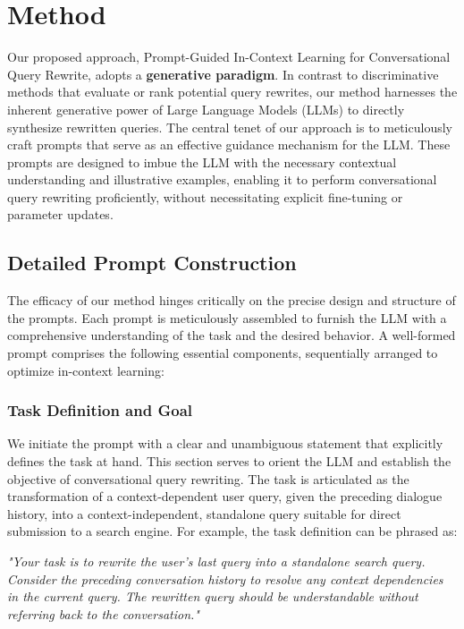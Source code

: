 \section{Method}

Our proposed approach, Prompt-Guided In-Context Learning for Conversational Query Rewrite, adopts a \textbf{generative paradigm}.  In contrast to discriminative methods that evaluate or rank potential query rewrites, our method harnesses the inherent generative power of Large Language Models (LLMs) to directly synthesize rewritten queries.  The central tenet of our approach is to meticulously craft prompts that serve as an effective guidance mechanism for the LLM. These prompts are designed to imbue the LLM with the necessary contextual understanding and illustrative examples, enabling it to perform conversational query rewriting proficiently, without necessitating explicit fine-tuning or parameter updates.

\subsection{Detailed Prompt Construction}

The efficacy of our method hinges critically on the precise design and structure of the prompts.  Each prompt is meticulously assembled to furnish the LLM with a comprehensive understanding of the task and the desired behavior.  A well-formed prompt comprises the following essential components, sequentially arranged to optimize in-context learning:

\subsubsection{Task Definition and Goal}
We initiate the prompt with a clear and unambiguous statement that explicitly defines the task at hand. This section serves to orient the LLM and establish the objective of conversational query rewriting.  The task is articulated as the transformation of a context-dependent user query, given the preceding dialogue history, into a context-independent, standalone query suitable for direct submission to a search engine.  For example, the task definition can be phrased as:

\textit{ "Your task is to rewrite the user's last query into a standalone search query.  Consider the preceding conversation history to resolve any context dependencies in the current query. The rewritten query should be understandable without referring back to the conversation."}

